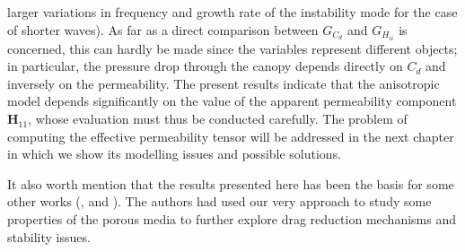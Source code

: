 larger variations in frequency and growth rate of the instability mode for the case of shorter waves).
As far as a direct comparison between $G_{C_d}$ and $G_{ {H}_{ii}}$ is concerned, this can hardly be made since
the variables represent different objects; in particular, the pressure drop through the canopy depends
directly on $C_d$ and inversely on the permeability. The present results indicate that the anisotropic
model depends significantly on the value of the apparent \citet{zampogna2016fluid} permeability component $\mathbf{H}_{11}$, whose
evaluation must thus be conducted carefully. The problem of computing the effective permeability tensor will be addressed in the next chapter in which we show its modelling issues and possible solutions.

It also worth mention that the results presented here has been the basis for some other works (\citet{segura2017permeable}, \citet{sharma2017stabilitycanopy} and \citet{garcia2017analysis}). The authors had used our very approach to study some properties of the porous media to further explore drag reduction mechanisms and stability issues.






